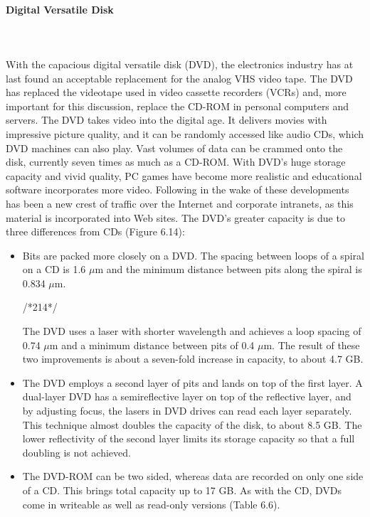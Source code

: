 \paragraph{Digital Versatile Disk }\mbox{}\\\\%
With the capacious digital versatile disk (DVD), the electronics industry has at last
found an acceptable replacement for the analog VHS video tape. The DVD has
replaced the videotape used in video cassette recorders (VCRs) and, more important
for this discussion, replace the CD-ROM in personal computers and servers.
The DVD takes video into the digital age. It delivers movies with impressive picture
quality, and it can be randomly accessed like audio CDs, which DVD machines
can also play. Vast volumes of data can be crammed onto the disk, currently seven
times as much as a CD-ROM. With DVD’s huge storage capacity and vivid quality,
PC games have become more realistic and educational software incorporates more
video. Following in the wake of these developments has been a new crest of traffic
over the Internet and corporate intranets, as this material is incorporated into
Web sites.
The DVD’s greater capacity is due to three differences from CDs (Figure 6.14):
\begin{itemize}
\item Bits are packed more closely on a DVD. The spacing between loops of a spiral on a
CD is 1.6 $\mu $m and the minimum distance between pits along the spiral is 0.834 $\mu $m.

/*214*/

The DVD uses a laser with shorter wavelength and achieves a loop spacing of
0.74 $\mu$m and a minimum distance between pits of 0.4 $\mu$m. The result of these
two improvements is about a seven-fold increase in capacity, to about 4.7 GB.
\item The DVD employs a second layer of pits and lands on top of the first layer. A
dual-layer DVD has a semireflective layer on top of the reflective layer, and
by adjusting focus, the lasers in DVD drives can read each layer separately.
This technique almost doubles the capacity of the disk, to about 8.5 GB. The
lower reflectivity of the second layer limits its storage capacity so that a full
doubling is not achieved.
\item The DVD-ROM can be two sided, whereas data are recorded on only one side
of a CD. This brings total capacity up to 17 GB.
As with the CD, DVDs come in writeable as well as read-only versions (Table 6.6).
\end{itemize}
